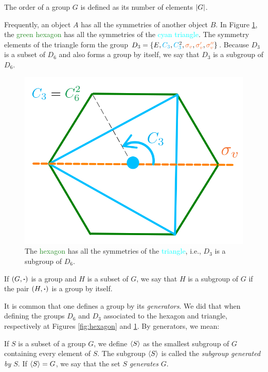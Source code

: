 \begin{definition}
The order of a group $G$ is defined as its number of elements $\abs{G}$.
\end{definition}

\begin{example}
Frequently, an object $A$ has all the symmetries of another object $B$. In Figure \ref{fig:hexagon_subgroup}, the \textcolor{ForestGreen}{green hexagon} has all the symmetries of the \textcolor{Cyan}{cyan triangle}. The symmetry elements of the triangle form the group $D_3 = \{E, \Ct, \Ctn{2}, \sv, \svp, \svpp\}$. Because $D_3$ is a subset of $D_6$ and also forms a group by itself, we say that $D_3$ is a subgroup of $D_6$.
\end{example}

\begin{figure}[H]
\centering
\includegraphics[width=0.4\linewidth]{fig/hexagon_subgroup.png}
\caption{The \textcolor{ForestGreen}{hexagon} has all the symmetries of the \textcolor{Cyan}{triangle}, i.e., $D_3$ is a subgroup of $D_6$.}
\label{fig:hexagon_subgroup}
\end{figure}


\begin{definition}
If $(G, \vdot)$ is a group and $H$ is a subset of $G$, we say that $H$ is a subgroup of $G$ if the pair $(H, \vdot)$ is a group by itself.
\end{definition}

It is common that one defines a group by its \textit{generators}. We did that when defining the groups $D_6$ and $D_3$ associated to the hexagon and triangle, respectively at Figures \ref{fig:hexagon} and \ref{fig:hexagon_subgroup}. By generators, we mean:

\begin{definition}
If $S$ is a subset of a group $G$, we define $\ev{S}$ as the smallest subgroup of $G$ containing every element of $S$. The subgroup $\ev{S}$ is called the \textit{subgroup generated by $S$}. If $\ev{S} = G$, we say that the set $S$ \textit{generates} $G$.
\end{definition}


